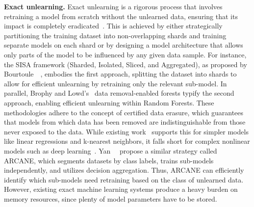 \documentclass[conference,compsoc]{IEEEtran}
\begin{document}
\noindent \textbf{Exact unlearning.}
\label{subsec:background_exact_unlearning}
Exact unlearning is a rigorous process that involves retraining a model from scratch without the unlearned data, ensuring that its impact is completely eradicated~\cite{hu2024duty}. This is achieved by either strategically partitioning the training dataset into non-overlapping shards and training separate models on each shard or by designing a model architecture that allows only parts of the model to be influenced by any given data sample. For instance, the SISA framework (Sharded, Isolated, Sliced, and Aggregated), as proposed by Bourtoule~\etal~\cite{bourtoule2021machine}, embodies the first approach, splitting the dataset into shards to allow for efficient unlearning by retraining only the relevant sub-model. In parallel, Brophy and Lowd's~\cite{brophy2021machine} data removal-enabled forests typify the second approach, enabling efficient unlearning within Random Forests. These methodologies adhere to the concept of certified data erasure, which guarantees that models from which data has been removed are indistinguishable from those never exposed to the data. While existing work~\cite{ginart2019making,schelter2021hedgecut} supports this for simpler models like linear regressions and k-nearest neighbors, it falls short for complex nonlinear models such as deep learning~\cite{izzo2021approximate}. Yan~\etal~\cite{yan2022arcane} propose a similar strategy called ARCANE, which segments datasets by class labels, trains sub-models independently, and utilizes decision aggregation. Thus, ARCANE can efficiently identify which sub-models need retraining based on the class of unlearned data. 
However, existing exact machine learning systems produce a heavy burden on memory resources, since plenty of model parameters have to be stored.
\end{document}

